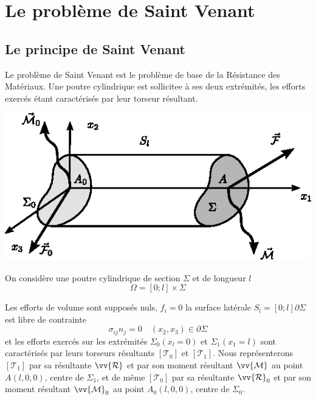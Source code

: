 \chapter{Le problème de Saint Venant}
\section{Le principe de Saint Venant}
Le problème de Saint Venant est le problème de base de la Résistance des Matériaux.
Une poutre cylindrique est sollicitee à ses deux extrémités, les efforts exercés étant caractérisés par leur torseur résultant.
\begin{multicols}{2}
    \begin{center}
        \includegraphics{../images/T1_Ch07-01}
    \end{center}
    \columnbreak
    On considère une poutre cylindrique de section $\Sigma$ et de longueur $l$
    \begin{equation*}
        \Omega = \left[ 0;l \right] \times \Sigma
    \end{equation*}
\end{multicols}
Les efforts de volume sont supposés nuls, $f_i= 0$ la surface latérale  $S_l= \left[ 0;l \right]\partial \Sigma$ est libre de contrainte
\begin{equation}
    \sigma_{ij} n_j = 0 \quad \left( x_2, x_3 \right) \in \partial \Sigma
    \label{eq:Ch07-001}
\end{equation}
et les efforts exercés sur les extrémités $\Sigma_0 \left( x_l =0 \right)$ et $\Sigma_1 \left( x_1 =l \right)$ sont caractérisés par leurs torseurs résultants $\left[ \mathcal{T}_0 \right]$ et $\left[ \mathcal{T}_1 \right]$.
Nous représenterons $\left[ \mathcal{T}_1 \right]$ par sa résultante $\vv{\mathcal{R}}$ et par son moment résultant $\vv{\mathcal{M}}$ au point $A\left( l,0,0 \right)$, centre de $\Sigma_1$, et de même $\left[ \mathcal{T}_0 \right]$ par sa résultante $\vv{\mathcal{R}}_0$ et par son moment résultant $\vv{\mathcal{M}}_0$ au point $A_0\left( l,0,0 \right)$, centre de $\Sigma_0$.
